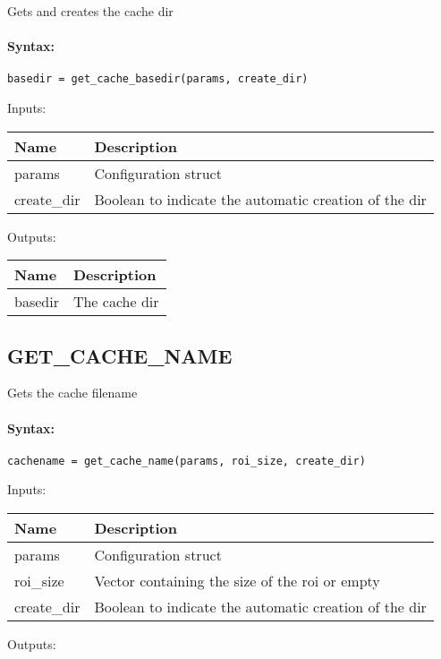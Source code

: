 Gets and creates the cache dir

\paragraph{Syntax:} \verb|basedir = get_cache_basedir(params, create_dir)|

\bigskip
Inputs:

\begin{tabular}{|p{}|p{}|}
\hline
\textbf{Name} & \textbf{Description} \\
\hline \hline
params & Configuration struct  \\ \hline
create\_dir & Boolean to indicate the automatic creation of the dir  \\ \hline
\end{tabular}

\bigskip
Outputs:

\begin{tabular}{|p{}|p{}|}
\hline
\textbf{Name} & \textbf{Description} \\
\hline \hline
basedir & The cache dir  \\ \hline
\end{tabular}

\subsection{GET\_CACHE\_NAME}

Gets the cache filename

\paragraph{Syntax:} \verb|cachename = get_cache_name(params, roi_size, create_dir)|

\bigskip
Inputs:

\begin{tabular}{|p{}|p{}|}
\hline
\textbf{Name} & \textbf{Description} \\
\hline \hline
params & Configuration struct  \\ \hline
roi\_size & Vector containing the size of the roi or empty  \\ \hline
create\_dir & Boolean to indicate the automatic creation of the dir  \\ \hline
\end{tabular}

\bigskip
Outputs:

